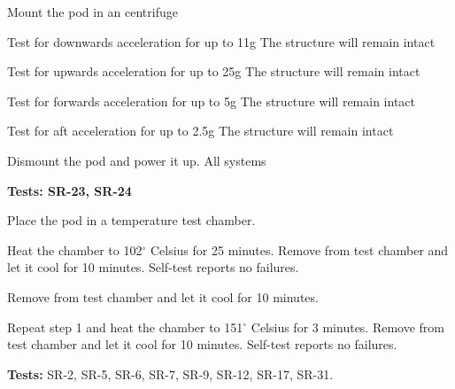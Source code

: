 \documentclass[Main]{subfiles}
\begin{document}
\begin{TestCase}
\TC
{Mount the pod in an centrifuge}
{}

\TC
{Test for downwards acceleration for up to 11g}
{The structure will remain intact}

\TC
{Test for upwards acceleration for up to 25g}
{The structure will remain intact}

\TC
{Test for forwards acceleration for up to 5g}
{The structure will remain intact}

\TC
{Test for aft acceleration for up to 2.5g}
{The structure will remain intact}

\TC
{Dismount the pod and power it up.}
{All systems}

\end{TestCase}


\newpage
\textbf{Tests: SR-23, SR-24}


\begin{TestCaseIntro}
\end{TestCaseIntro}

\begin{TestCase}
\TC
{Place the pod in a temperature test chamber.}
{}


\TC
{Heat the chamber to 102$^\circ$ Celsius for 25 minutes. 
Remove from test chamber and let it cool for 10 minutes.}
{Self-test reports no failures.}


\TC
{Remove from test chamber and let it cool for 10 minutes.}
{}

\TC
{Repeat step 1 and heat the chamber to 151$^\circ$ Celsius for 3 minutes. 
Remove from test chamber and let it cool for 10 minutes.}
{Self-test reports no failures.}


\end{TestCase}


\newpage

\textbf{Tests:} SR-2, SR-5, SR-6, SR-7, SR-9, SR-12, SR-17, SR-31.


\begin{TestCaseIntro}
\end{TestCaseIntro}
\end{document}
